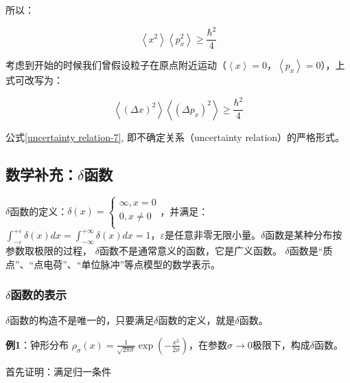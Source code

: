所以：

\begin{equation}
\left\langle {x^2 } \right\rangle \left\langle {p_x ^2 } \right\rangle  \ge \frac{{\hbar ^2 }}{4}
\end{equation}

考虑到开始的时候我们曾假设粒子在原点附近运动（$\left\langle x \right\rangle = 0$，$\left\langle p_x \right\rangle = 0$），上式可改写为：

\begin{center}
\begin{equation}\label{uncertainty relation-7}
    \left\langle {\left( {\Delta x} \right)^2 } \right\rangle \left\langle {\left( {\Delta p_x } \right)^2 } \right\rangle  \ge \frac{{\hbar ^2 }}{4}
\end{equation}
\end{center}


公式\ref{uncertainty relation-7}, 即不确定关系（uncertainty relation）的严格形式。

\subsection{数学补充：$\delta$函数}


$\delta$函数的定义：$\delta (x) = \left\{ \begin{array}{l}
 \infty ,x = 0 \\
 0,x \ne 0 \\
 \end{array} \right.$，并满足：$\int_{ - \varepsilon }^{ + \varepsilon } {\delta (x)dx}  = \int_{ - \infty }^{ + \infty } {\delta (x)dx}  = 1$，$\varepsilon$是任意非零无限小量。$\delta$函数是某种分布按参数取极限的过程，
$\delta$函数不是通常意义的函数，它是广义函数。 $\delta$函数是``质点''、``点电荷''、``单位脉冲''等点模型的数学表示。

\subsubsection{$\delta$函数的表示}

$\delta$函数的构造不是唯一的，只要满足$\delta$函数的定义，就是$\delta$函数。

\textbf{例1}：钟形分布 $\rho _\sigma  (x) = \frac{1}{{\sqrt {2\pi
\sigma } }}\exp \left( { - \frac{{x^2 }}{{2\sigma }}}
\right)$，在参数$\sigma  \to 0$极限下，构成$\delta$函数。

首先证明：满足归一条件

